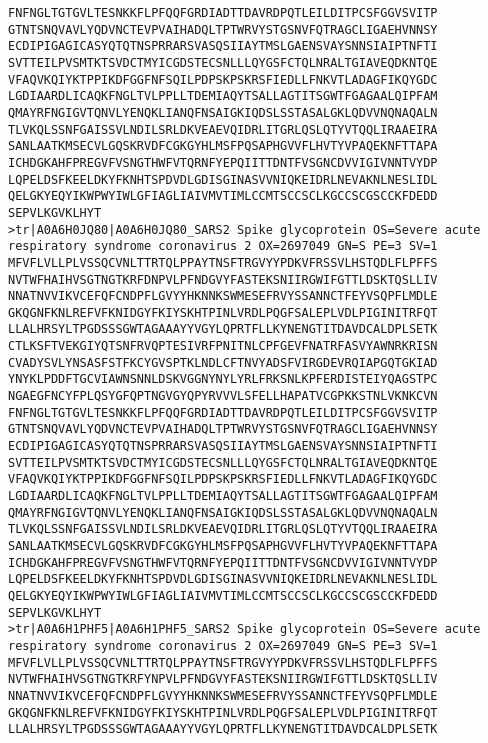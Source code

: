 \documentclass[en,black,12pt,normal]{elegantnote}
\begin{document}
\begin{lstlisting}
FNFNGLTGTGVLTESNKKFLPFQQFGRDIADTTDAVRDPQTLEILDITPCSFGGVSVITP
GTNTSNQVAVLYQDVNCTEVPVAIHADQLTPTWRVYSTGSNVFQTRAGCLIGAEHVNNSY
ECDIPIGAGICASYQTQTNSPRRARSVASQSIIAYTMSLGAENSVAYSNNSIAIPTNFTI
SVTTEILPVSMTKTSVDCTMYICGDSTECSNLLLQYGSFCTQLNRALTGIAVEQDKNTQE
VFAQVKQIYKTPPIKDFGGFNFSQILPDPSKPSKRSFIEDLLFNKVTLADAGFIKQYGDC
LGDIAARDLICAQKFNGLTVLPPLLTDEMIAQYTSALLAGTITSGWTFGAGAALQIPFAM
QMAYRFNGIGVTQNVLYENQKLIANQFNSAIGKIQDSLSSTASALGKLQDVVNQNAQALN
TLVKQLSSNFGAISSVLNDILSRLDKVEAEVQIDRLITGRLQSLQTYVTQQLIRAAEIRA
SANLAATKMSECVLGQSKRVDFCGKGYHLMSFPQSAPHGVVFLHVTYVPAQEKNFTTAPA
ICHDGKAHFPREGVFVSNGTHWFVTQRNFYEPQIITTDNTFVSGNCDVVIGIVNNTVYDP
LQPELDSFKEELDKYFKNHTSPDVDLGDISGINASVVNIQKEIDRLNEVAKNLNESLIDL
QELGKYEQYIKWPWYIWLGFIAGLIAIVMVTIMLCCMTSCCSCLKGCCSCGSCCKFDEDD
SEPVLKGVKLHYT
>tr|A0A6H0JQ80|A0A6H0JQ80_SARS2 Spike glycoprotein OS=Severe acute respiratory syndrome coronavirus 2 OX=2697049 GN=S PE=3 SV=1
MFVFLVLLPLVSSQCVNLTTRTQLPPAYTNSFTRGVYYPDKVFRSSVLHSTQDLFLPFFS
NVTWFHAIHVSGTNGTKRFDNPVLPFNDGVYFASTEKSNIIRGWIFGTTLDSKTQSLLIV
NNATNVVIKVCEFQFCNDPFLGVYYHKNNKSWMESEFRVYSSANNCTFEYVSQPFLMDLE
GKQGNFKNLREFVFKNIDGYFKIYSKHTPINLVRDLPQGFSALEPLVDLPIGINITRFQT
LLALHRSYLTPGDSSSGWTAGAAAYYVGYLQPRTFLLKYNENGTITDAVDCALDPLSETK
CTLKSFTVEKGIYQTSNFRVQPTESIVRFPNITNLCPFGEVFNATRFASVYAWNRKRISN
CVADYSVLYNSASFSTFKCYGVSPTKLNDLCFTNVYADSFVIRGDEVRQIAPGQTGKIAD
YNYKLPDDFTGCVIAWNSNNLDSKVGGNYNYLYRLFRKSNLKPFERDISTEIYQAGSTPC
NGAEGFNCYFPLQSYGFQPTNGVGYQPYRVVVLSFELLHAPATVCGPKKSTNLVKNKCVN
FNFNGLTGTGVLTESNKKFLPFQQFGRDIADTTDAVRDPQTLEILDITPCSFGGVSVITP
GTNTSNQVAVLYQDVNCTEVPVAIHADQLTPTWRVYSTGSNVFQTRAGCLIGAEHVNNSY
ECDIPIGAGICASYQTQTNSPRRARSVASQSIIAYTMSLGAENSVAYSNNSIAIPTNFTI
SVTTEILPVSMTKTSVDCTMYICGDSTECSNLLLQYGSFCTQLNRALTGIAVEQDKNTQE
VFAQVKQIYKTPPIKDFGGFNFSQILPDPSKPSKRSFIEDLLFNKVTLADAGFIKQYGDC
LGDIAARDLICAQKFNGLTVLPPLLTDEMIAQYTSALLAGTITSGWTFGAGAALQIPFAM
QMAYRFNGIGVTQNVLYENQKLIANQFNSAIGKIQDSLSSTASALGKLQDVVNQNAQALN
TLVKQLSSNFGAISSVLNDILSRLDKVEAEVQIDRLITGRLQSLQTYVTQQLIRAAEIRA
SANLAATKMSECVLGQSKRVDFCGKGYHLMSFPQSAPHGVVFLHVTYVPAQEKNFTTAPA
ICHDGKAHFPREGVFVSNGTHWFVTQRNFYEPQIITTDNTFVSGNCDVVIGIVNNTVYDP
LQPELDSFKEELDKYFKNHTSPDVDLGDISGINASVVNIQKEIDRLNEVAKNLNESLIDL
QELGKYEQYIKWPWYIWLGFIAGLIAIVMVTIMLCCMTSCCSCLKGCCSCGSCCKFDEDD
SEPVLKGVKLHYT
>tr|A0A6H1PHF5|A0A6H1PHF5_SARS2 Spike glycoprotein OS=Severe acute respiratory syndrome coronavirus 2 OX=2697049 GN=S PE=3 SV=1
MFVFLVLLPLVSSQCVNLTTRTQLPPAYTNSFTRGVYYPDKVFRSSVLHSTQDLFLPFFS
NVTWFHAIHVSGTNGTKRFYNPVLPFNDGVYFASTEKSNIIRGWIFGTTLDSKTQSLLIV
NNATNVVIKVCEFQFCNDPFLGVYYHKNNKSWMESEFRVYSSANNCTFEYVSQPFLMDLE
GKQGNFKNLREFVFKNIDGYFKIYSKHTPINLVRDLPQGFSALEPLVDLPIGINITRFQT
LLALHRSYLTPGDSSSGWTAGAAAYYVGYLQPRTFLLKYNENGTITDAVDCALDPLSETK

\end{lstlisting}
\end{document}
